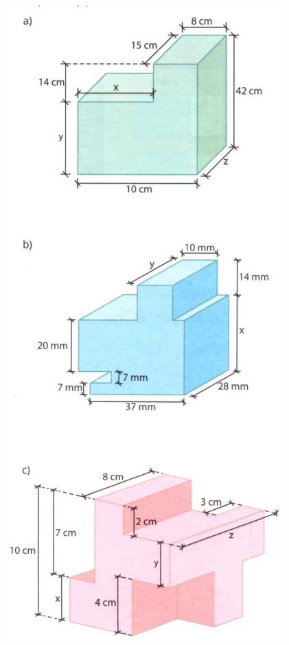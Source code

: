 \documentclass[a4paper,14pt]{article}
\begin{document}
\begin{multicols}{2}
\begin{enumerate}
			\includegraphics[width=1\linewidth]{6FMA29_imagens/imagem3} \\

\end{enumerate}
\end{multicols}
\end{document}
